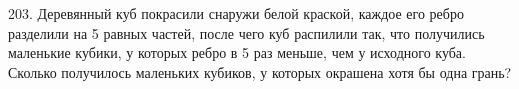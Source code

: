203. Деревянный куб покрасили снаружи белой краской, каждое его ребро разделили на 5 равных частей, после чего куб распилили так, что получились маленькие кубики, у которых ребро в 5 раз меньше, чем у исходного куба. Сколько получилось маленьких кубиков, у которых окрашена хотя бы одна грань?\\ 
